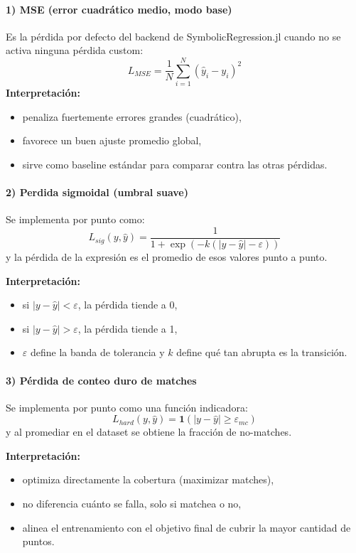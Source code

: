 \documentclass[12pt]{article}
\begin{document}
\paragraph{1) MSE (error cuadrático medio, modo base)}
Es la pérdida por defecto del backend de SymbolicRegression.jl cuando no se activa ninguna pérdida custom:
\[
L_{MSE}=\frac{1}{N}\sum_{i=1}^{N}(\hat y_i-y_i)^2
\]
\textbf{Interpretación:}
\begin{itemize}[leftmargin=1.5em]
    \item penaliza fuertemente errores grandes (cuadrático),
    \item favorece un buen ajuste promedio global,
    \item sirve como baseline estándar para comparar contra las otras pérdidas.
\end{itemize}

\paragraph{2) Perdida sigmoidal (umbral suave)}
Se implementa por punto como:
\[
L_{sig}(y,\hat y)=\frac{1}{1+\exp\left(-k\left(|y-\hat y|-\varepsilon\right)\right)}
\]
y la pérdida de la expresión es el promedio de esos valores punto a punto.

\textbf{Interpretación:}
\begin{itemize}[leftmargin=1.5em]
    \item si $|y-\hat y|<\varepsilon$, la pérdida tiende a 0,
    \item si $|y-\hat y|>\varepsilon$, la pérdida tiende a 1,
    \item $\varepsilon$ define la banda de tolerancia y $k$ define qué tan abrupta es la transición.
\end{itemize}

\paragraph{3) Pérdida de conteo duro de matches}
Se implementa por punto como una función indicadora:
\[
L_{hard}(y,\hat y)=\mathbf{1}\left(|y-\hat y|\geq\varepsilon_{mc}\right)
\]
y al promediar en el dataset se obtiene la fracción de no-matches.

\textbf{Interpretación:}
\begin{itemize}[leftmargin=1.5em]
    \item optimiza directamente la cobertura (maximizar matches),
    \item no diferencia cuánto se falla, solo si matchea o no,
    \item alinea el entrenamiento con el objetivo final de cubrir la mayor cantidad de puntos.
\end{itemize}
\end{document}
